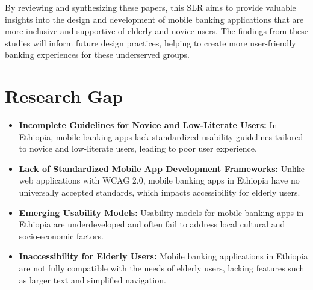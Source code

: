 \documentclass[a4paper,12pt]{report}
\begin{document}
By reviewing and synthesizing these papers, this SLR aims to provide valuable insights into the design and development of mobile banking applications that are more inclusive and supportive of elderly and novice users. The findings from these studies will inform future design practices, helping to create more user-friendly banking experiences for these underserved groups.

\section{Research Gap}

\begin{itemize}
  \item \textbf{Incomplete Guidelines for Novice and Low-Literate Users:}
        In Ethiopia, mobile banking apps lack standardized usability guidelines tailored to novice and low-literate users, leading to poor user experience.

  \item \textbf{Lack of Standardized Mobile App Development Frameworks:}
        Unlike web applications with WCAG 2.0, mobile banking apps in Ethiopia have no universally accepted standards, which impacts accessibility for elderly users.

  \item \textbf{Emerging Usability Models:}
        Usability models for mobile banking apps in Ethiopia are underdeveloped and often fail to address local cultural and socio-economic factors.

  \item \textbf{Inaccessibility for Elderly Users:}
        Mobile banking applications in Ethiopia are not fully compatible with the needs of elderly users, lacking features such as larger text and simplified navigation.
\end{itemize}
\end{document}
